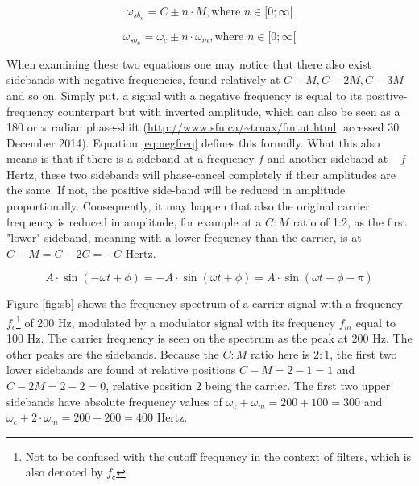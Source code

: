   \begin{equation}
    \omega_{{sb}_{n}} = C \pm n \cdot M, \text{where } n \in [0;\infty[
    \label{eq:sbcm}
  \end{equation}

  \begin{equation}
    \omega_{{sb}_{n}} = \omega_{c} \pm n \cdot \omega_{m}, \text{where } n \in [0;\infty[
    \label{eq:sbabs}
  \end{equation}

  \noindent When examining these two equations one may notice that there also exist sidebands with negative frequencies, found relatively at $C - M, C - 2M, C - 3M$ and so on. Simply put, a signal with a negative frequency is equal to its positive-frequency counterpart but with inverted amplitude, which can also be seen as a 180\degree{} or $\pi$ radian phase-shift (\url{http://www.sfu.ca/~truax/fmtut.html}, accessed 30 December 2014). Equation \ref{eq:negfreq} defines this formally. What this also means is that if there is a sideband at a frequency $f$ and another sideband at $-f$ Hertz, these two sidebands will phase-cancel completely if their amplitudes are the same. If not, the positive side-band will be reduced in amplitude proportionally. Consequently, it may happen that also the original carrier frequency is reduced in amplitude, for example at a $C:M$ ratio of 1:2, as the first "lower" sideband, meaning with a lower frequency than the carrier, is at $C - M = C - 2C = -C$ Hertz.

  \begin{equation}
    A \cdot \sin(-\omega t + \phi) = -A \cdot \sin(\omega t + \phi) = A \cdot \sin(\omega t + \phi - \pi)
    \label{eq:negfreq}
  \end{equation}

  \noindent Figure \ref{fig:sb} shows the frequency spectrum of a carrier signal with a frequency $f_{c}$\footnote{Not to be confused with the cutoff frequency in the context of filters, which is also denoted by $f_{c}$} of 200 Hz, modulated by a modulator signal with its frequency $f_{m}$ equal to 100 Hz. The carrier frequency is seen on the spectrum as the peak at 200 Hz. The other peaks are the sidebands. Because the $C:M$ ratio here is $2:1$, the first two lower sidebands are found at relative positions $C-M=2-1=1$ and $C-2M=2-2=0$, relative position $2$ being the carrier. The first two upper sidebands have absolute frequency values of $\omega_{c} + \omega_{m} = 200 + 100 = 300$ and %
  $\omega_{c} +2\cdot\omega_{m} = 200 + 200 = 400$ Hertz.\\

